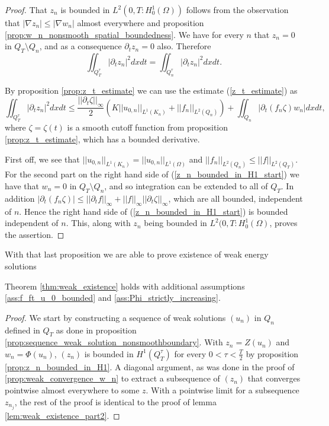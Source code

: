 \documentclass[11pt, a4paper]{article}
\begin{document}
\begin{proof}
That $z_n$ is bounded in $L^2(0,T: H_0^1(\Omega))$ follows from the observation that $|\nabla z_n| \leq |\nabla w_n|$ almost everywhere and proposition \ref{prop:w_n_nonsmooth_spatial_boundedness}. We have for every $n$ that $z_n = 0$ in $Q_T\setminus Q_n$, and as a consequence $\partial_t z_n = 0$ also. Therefore
\begin{equation*}
\iint_{Q_T^\tau} |\partial_t z_n|^2 dxdt = \iint_{Q_n^\tau} |\partial_t z_n|^2 dxdt.
\end{equation*} 

By proposition \ref{prop:z_t_estimate} we can use the estimate (\ref{z_t_estimate}) as
\begin{equation}
\label{z_n_bounded_in_H1_start}
\iint_{Q_T^\tau} |\partial_t z_n|^2 dxdt \leq \frac{||\partial_t \zeta||_\infty}{2}\left( K||u_{0,n}||_{L^1(K_n)} + ||f_n||_{L^2(Q_n)}\right) + \iint_{Q_n}|\partial_t (f_n \zeta ) w_n| dxdt,
\end{equation}
where $\zeta = \zeta(t)$ is a smooth cutoff function from proposition \ref{prop:z_t_estimate}, which has a bounded derivative.

First off, we see that $||u_{0,n}||_{L^1(K_n)} = ||u_{0,n}||_{L^1(\Omega)}$ and $||f_n||_{L^2(Q_n)} \leq ||f||_{L^2(Q_T)}$. For the second part on the right hand side of (\ref{z_n_bounded_in_H1_start}) we have that $w_n=0$ in $Q_T\setminus Q_n$, and so integration can be extended to all of $Q_T$. In addition $|\partial_t (f_n \zeta)| \leq ||\partial_t f||_{\infty} + ||f||_\infty ||\partial_t \zeta||_\infty$, which are all bounded, independent of $n$. Hence the right hand side of (\ref{z_n_bounded_in_H1_start}) is bounded independent of $n$. This, along with $z_n$ being bounded in $L^2(0,T: H^1_0(\Omega)$, proves the assertion.
\end{proof}

With that last proposition we are able to prove existence of weak energy solutions

\begin{lemma}
\label{lem:weak_existence_part3}
Theorem \ref{thm:weak_existence} holds with additional assumptions \ref{ass:f_ft_u_0_bounded} and \ref{ass:Phi_strictly_increasing}.
\end{lemma}

\begin{proof}
We start by constructing a sequence of weak solutions $(u_n)$ in $Q_n$ defined in $Q_T$ as done in proposition \ref{prop:sequence_weak_solution_nonsmoothboundary}. With $z_n = Z(u_n)$ and $w_n = \Phi(u_n)$, $(z_n)$ is bounded in $H^1(Q_T^\tau)$ for every $0< \tau < \frac{T}{2}$ by proposition \ref{prop:z_n_bounded_in_H1}. A diagonal argument, as was done in the proof of \ref{prop:weak_convergence_w_n} to extract a subsequence of $(z_n)$ that converges pointwise almost everywhere to some $z$. With a pointwise limit for a subsequence $z_{n_j}$, the rest of the proof is identical to the proof of lemma \ref{lem:weak_existence_part2}.  
\end{proof}
\end{document}
